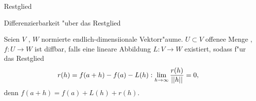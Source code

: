\documentclass[class=article, crop=false]{standalone}
\begin{document}
\begin{zettel}{Restglied}
\begin{flashcard}
\begin{question}
Differenzierbarkeit "uber das Restglied
\end{question}
\begin{definition}
        Seien $V$ , $W$ normierte endlich-dimensiionale Vektorr"aume. $U \subset V$ offenee Menge , $f: U \to W$ ist diffbar, falls eine lineare Abbildung $L: V \to  W$ existiert, sodass f"ur das Restglied
\[
r (h)=  f ( a + h ) - f (a)- L (h) : \lim_{h \to \infty} \frac{r (h)}{ \left|\left|h\right|\right|} = 0
,\] 
denn $f (a +h) = f (a) + L (h)+ r (h)$.
\end{definition}

\end{flashcard}
\end{zettel}
\end{document}
